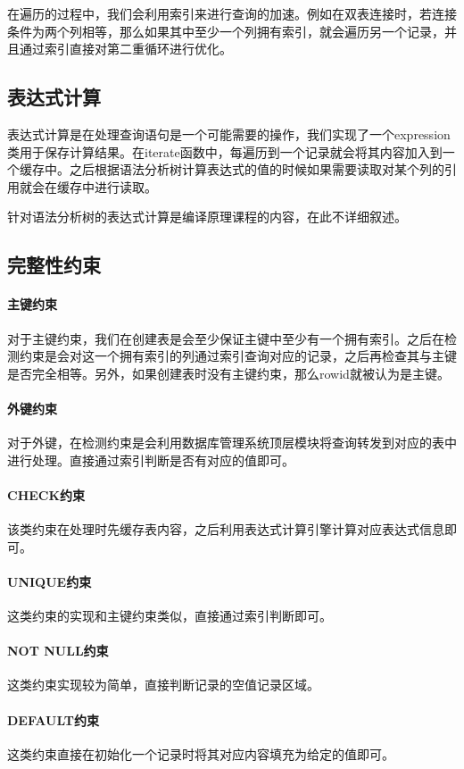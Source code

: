 \documentclass[10pt]{article}
\begin{document}
在遍历的过程中，我们会利用索引来进行查询的加速。例如在双表连接时，若连接条件为两个列相等，那么如果其中至少一个列拥有索引，就会遍历另一个记录，并且通过索引直接对第二重循环进行优化。
\subsection{表达式计算}
表达式计算是在处理查询语句是一个可能需要的操作，我们实现了一个expression类用于保存计算结果。在iterate函数中，每遍历到一个记录就会将其内容加入到一个缓存中。之后根据语法分析树计算表达式的值的时候如果需要读取对某个列的引用就会在缓存中进行读取。

针对语法分析树的表达式计算是编译原理课程的内容，在此不详细叙述。
\subsection{完整性约束}
\paragraph{主键约束} 对于主键约束，我们在创建表是会至少保证主键中至少有一个拥有索引。之后在检测约束是会对这一个拥有索引的列通过索引查询对应的记录，之后再检查其与主键是否完全相等。另外，如果创建表时没有主键约束，那么rowid就被认为是主键。
\paragraph{外键约束} 对于外键，在检测约束是会利用数据库管理系统顶层模块将查询转发到对应的表中进行处理。直接通过索引判断是否有对应的值即可。
\paragraph{CHECK约束} 该类约束在处理时先缓存表内容，之后利用表达式计算引擎计算对应表达式信息即可。
\paragraph{UNIQUE约束} 这类约束的实现和主键约束类似，直接通过索引判断即可。
\paragraph{NOT NULL约束} 这类约束实现较为简单，直接判断记录的空值记录区域。
\paragraph{DEFAULT约束} 这类约束直接在初始化一个记录时将其对应内容填充为给定的值即可。
\end{document}
